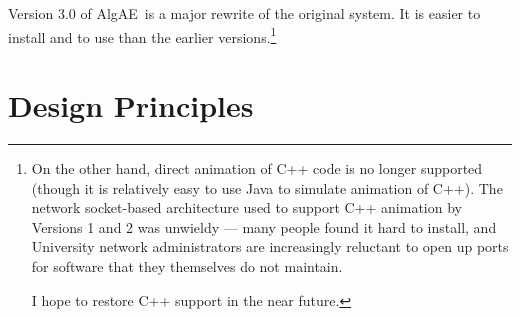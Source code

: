\documentclass[11pt,titlepage]{book}
\newcommand{\algae}{{\sc AlgAE}}
\begin{document}
Version 3.0 of \algae\ is a major rewrite of the original system. It
is easier to install and to use than the earlier versions.\footnote{On the
other hand, direct animation of C++ code is no longer supported
(though it is relatively easy to use Java to simulate animation of
C++). The network socket-based architecture used to support C++
animation by Versions 1 and 2 was unwieldy --- many people found it
hard to install, and University network administrators are
increasingly reluctant to open up ports for software that they
themselves do not maintain.

I hope to restore C++ support in the near future.}



\section{Design Principles}
\end{document}
